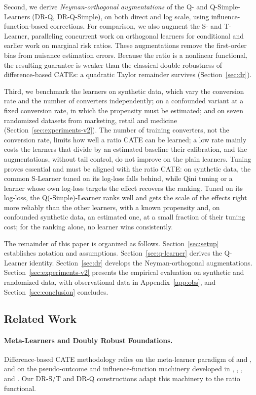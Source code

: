 \documentclass{article}
\begin{document}
Second, we derive \emph{Neyman-orthogonal augmentations} of the Q- and
Q-Simple-Learners (DR-Q, DR-Q-Simple), on both direct and log scale,
using influence-function-based corrections. For comparison, we also
augment the S- and T-Learner, paralleling concurrent work on
orthogonal learners for conditional \citep{ge2026orthogonal} and
earlier work on marginal \citep{boughdiri2025} risk ratios. These augmentations
remove the first-order bias from nuisance estimation errors. Because
the ratio is a nonlinear functional, the resulting guarantee is
weaker than the classical double robustness of difference-based
CATEs: a quadratic Taylor remainder survives
(Section~\ref{sec:dr}).

Third, we benchmark the learners on synthetic data, which vary the
conversion rate and the number of converters independently; on a
confounded variant at a fixed conversion rate, in which the propensity must
be estimated; and on seven randomized datasets from marketing, retail and
medicine (Section~\ref{sec:experiments-v2}). The number of training
converters, not the conversion rate, limits how well a ratio CATE can be
learned; a low rate mainly costs the learners that divide by an estimated
baseline their calibration, and the augmentations, without tail control, do
not improve on the plain learners. Tuning proves essential and must be
aligned with the ratio CATE: on synthetic data, the common S-Learner tuned on its log-loss
falls behind, while Qini tuning or a learner whose own log-loss targets the
effect recovers the ranking. Tuned on its log-loss, the Q(-Simple)-Learner
ranks well and gets the scale of the effects right more reliably than the
other learners, with a known propensity and, on confounded synthetic data,
an estimated one, at a
small fraction of their tuning cost; for the ranking alone, no learner wins
consistently.

The remainder of this paper is organized as follows.
Section~\ref{sec:setup} establishes notation and assumptions.
Section~\ref{sec:q-learner} derives the Q-Learner identity.
Section~\ref{sec:dr} develops the Neyman-orthogonal augmentations.
Section~\ref{sec:experiments-v2} presents the empirical evaluation on
synthetic and randomized data, with observational data in
Appendix~\ref{app:obs}, and
Section~\ref{sec:conclusion} concludes.

\subsection{Related Work}
\label{sec:related}
\paragraph{Meta-Learners and Doubly Robust Foundations.}
Difference-based CATE methodology relies on the meta-learner paradigm
of \citet{kunzel2019metalearners} and \citet{nie2021quasi}, and on the
pseudo-outcome and influence-function machinery developed in
\citet{robins1994estimation}, \citet{chernozhukov2018double},
\citet{kennedy2023optimal}, and \citet{foster2023orthogonal}. Our
DR-S/T and DR-Q constructions adapt this machinery to the ratio
functional.
\end{document}
